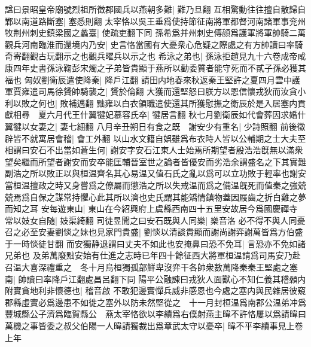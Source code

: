 諡曰景昭皇帝廟號烈祖所徵郡國兵以燕朝多難|{
	難乃旦翻}
互相驚動往往擅自散歸自鄴以南道路斷塞|{
	塞悉則翻}
太宰恪以吳王垂爲使持節征南將軍都督河南諸軍事兖州牧荆州刺史鎮梁國之蠡臺|{
	使疏吏翻下同}
孫希爲并州刺史傅顔爲護軍將軍帥騎二萬觀兵河南臨淮而還境内乃安|{
	史言恪當國有大憂衆心危疑之際處之有方帥讀曰率騎奇寄翻觀古玩翻示之也觀兵曜兵以示之也}
希泳之弟也|{
	孫泳拒趙見九十六卷成帝咸康四年史書孫泳鞠彭宋燭之子弟皆貴顯于燕所以勸委質者能守死而不貳子孫必獲其福也}
匈奴劉衛辰遣使降秦|{
	降戶江翻}
請田内地春來秋返秦王堅許之夏四月雲中護軍賈雍遣司馬徐贇帥騎襲之|{
	贇於倫翻}
大獲而還堅怒曰朕方以恩信懷戎狄而汝貪小利以敗之何也|{
	敗補邁翻}
黜雍以白衣領職遣使還其所獲慰撫之衛辰於是入居塞内貢獻相尋　夏六月代王什翼犍妃慕容氏卒|{
	犍居言翻}
秋七月劉衛辰如代會葬因求婚什翼犍以女妻之|{
	妻七細翻}
八月辛丑朔日有食之既　謝安少有重名|{
	少詩照翻}
前後徵辟皆不就寓居會稽|{
	會工外翻}
以山水文籍自娯雖爲布衣時人皆以公輔期之士大夫至相謂曰安石不出當如蒼生何|{
	謝安字安石江東人士始焉所期望者殷浩浩旣無以滿衆望矣繼而所望者謝安而安卒能匡輔晉室世之論者皆優安而劣浩余謂盛名之下其實難副浩之所以敗正以與桓温齊名其心易温又值石氏之亂以爲可以立功敗于輕率也謝安當桓温擅政之時又身嘗爲之僚屬而懲浩之所以失戒温而爲之備温旣死而值秦之強兢兢焉爲自保之謀常持懼心此其所以濟也史氏謂其能矯情鎮物蓋因屐齒之折白雞之夢而知之耳}
安每遊東山|{
	東山在今紹興府上虞縣西南四十五里安故居今爲國慶禪寺}
常以妓女自随|{
	妓渠綺翻}
司徒昱聞之曰安石既與人同樂|{
	樂音洛}
必不得不與人同憂召之必至安妻劉惔之妹也見家門貴盛|{
	劉惔以清談貴顯而謝尚謝弈謝萬皆爲方伯盛于一時惔徒甘翻}
而安獨静退謂曰丈夫不如此也安掩鼻曰恐不免耳|{
	言恐亦不免如諸兄弟也}
及弟萬廢黜安始有仕進之志時已年四十餘征西大將軍桓温請爲司馬安乃赴召温大喜深禮重之　冬十月烏桓獨孤部鮮卑沒弈干各帥衆數萬降秦秦王堅處之塞南|{
	帥讀曰率降戶江翻處昌呂翻下同}
陽平公融諫曰戎狄人面獸心不知仁義其稽顙内附實貪地利非懷德也|{
	稽音啟}
不敢犯邊實憚兵威非感恩也今處之塞内與民雜居彼窺郡縣虛實必爲邊患不如徙之塞外以防未然堅從之　十一月封桓温爲南郡公温弟冲爲豐城縣公子濟爲臨賀縣公　燕太宰恪欲以李績爲右僕射燕主暐不許恪屢以爲請暐曰萬機之事皆委之叔父伯陽一人暐請獨裁出爲章武太守以憂卒|{
	暐不平李績事見上卷上年}


